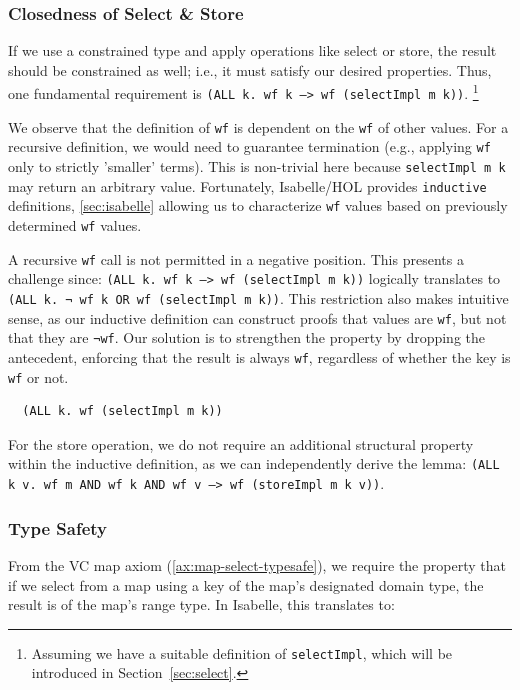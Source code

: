 \documentclass[11pt]{article}
\begin{document}
\subsubsection{Closedness of Select \& Store}
\label{sec:closed}

If we use a constrained type and apply operations like select or store,
the result should be constrained as well; i.e., it must satisfy our desired properties.
Thus, one fundamental requirement is \texttt{(ALL k. wf k --> wf (selectImpl m k))}.
\footnote{Assuming we have a suitable definition of \texttt{selectImpl}, which will be introduced in Section~\ref{sec:select}.}

We observe that the definition of \texttt{wf} is dependent on the \texttt{wf} of other values.
For a recursive definition, we would need to guarantee termination
(e.g., applying \texttt{wf} only to strictly 'smaller' terms).
This is non-trivial here because \texttt{selectImpl m k} may return an arbitrary value.
Fortunately, Isabelle/HOL provides \texttt{inductive} definitions,
\ref{sec:isabelle}
allowing us to characterize \texttt{wf} values based on previously determined \texttt{wf} values.

A recursive \texttt{wf} call is not permitted in a negative position. This presents a challenge since:
\texttt{(ALL k. wf k --> wf (selectImpl m k))} logically translates to \texttt{(ALL k. ¬ wf k OR wf (selectImpl m k))}.
This restriction also makes intuitive sense, as our inductive definition can construct proofs that values are \texttt{wf},
but not that they are \texttt{¬wf}.
Our solution is to strengthen the property by dropping the antecedent,
enforcing that the result is always \texttt{wf}, regardless of whether the key is \texttt{wf} or not.

\begin{verbatim}
  (ALL k. wf (selectImpl m k))
\end{verbatim}

For the store operation, we do not require an additional structural property within the inductive definition, as we can independently derive the lemma:
\texttt{(ALL k v. wf m AND wf k AND wf v --> wf (storeImpl m k v))}.


\subsubsection{Type Safety}
\label{sec:type-safety}
From the VC map axiom (\ref{ax:map-select-typesafe}),
we require the property that if we select from a map using a key of the map's designated domain type,
the result is of the map's range type.
In Isabelle, this translates to:
\end{document}
